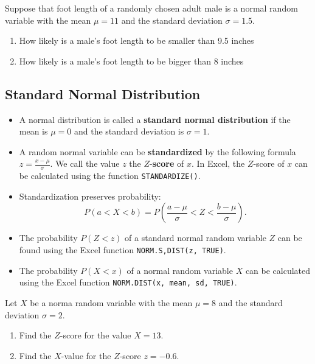 \begin{example}

Suppose that foot length of a randomly chosen adult male is a normal
random variable with the mean \(\mu=11\) and the standard deviation
\(\sigma=1.5\).

\begin{enumerate}
\item
  How likely is a male's foot length to be smaller than 9.5 inches
\item
  How likely is a male's foot length to be bigger than 8 inches
\end{enumerate}

\end{example}

\hypertarget{standard-normal-distribution}{%
\subsection{Standard Normal
Distribution}\label{standard-normal-distribution}}

\begin{itemize}
\item
  A normal distribution is called a \textbf{standard normal
  distribution} if the mean is \(\mu=0\) and the standard deviation is
  \(\sigma=1\).
\item
  A random normal variable can be \textbf{standardized} by the following
  formula \(z=\frac{x-\mu}{\sigma}.\) We call the value \(z\) the
  \(Z\)-\textbf{score} of \(x\). In Excel, the \(Z\)-score of \(x\) can
  be calculated using the function \texttt{STANDARDIZE()}.
\item
  Standardization preserves probability:
  \[P(a<X<b)=P\left(\frac{a-\mu}{\sigma}< Z < \frac{b-\mu}{\sigma}\right).\]
\item
  The probability \(P(Z< z)\) of a standard normal random variable \(Z\)
  can be found using the Excel function \texttt{NORM.S,DIST(z,\ TRUE)}.
\item
  The probability \(P(X< x)\) of a normal random variable \(X\) can be
  calculated using the Excel function
  \texttt{NORM.DIST(x,\ mean,\ sd,\ TRUE)}.
\end{itemize}

\begin{example}

Let \(X\) be a norma random variable with the mean \(\mu = 8\) and the
standard deviation \(\sigma=2\).

\begin{enumerate}
\item
  Find the \(Z\)-score for the value \(X=13\).
\item
  Find the \(X\)-value for the \(Z\)-score \(z=-0.6\).
\end{enumerate}

\end{example}

